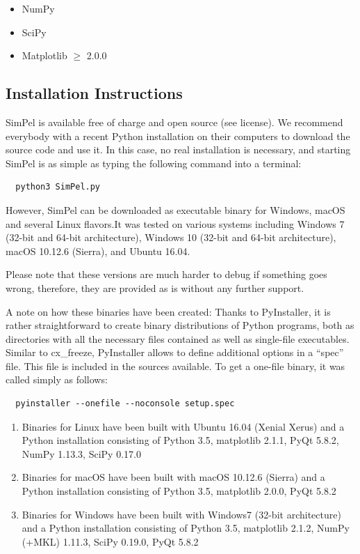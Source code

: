 \documentclass[pdftex,bezier,german,a4,twoside, headexclude,12pt,nochapterprefix, titlepage]{extarticle}
\newcommand{\simpel}{\textsf{SimPel}}
\begin{document}
\begin{itemize}
\item NumPy
\item SciPy
\item Matplotlib $\ge$ 2.0.0
\end{itemize}



\subsection{Installation Instructions}

\simpel{} is available free of charge and open source (see license). We recommend everybody with a recent Python installation on their computers to download the source code and use it. In this case, no real installation is necessary, and starting \simpel{} is as simple as typing the following command into a terminal:

\begin{verbatim}
  python3 SimPel.py
\end{verbatim}

However, \simpel{} can be downloaded as executable binary for Windows, macOS and several Linux flavors.It was tested on various systems including Windows 7 (32-bit and 64-bit architecture), Windows 10 (32-bit and 64-bit architecture), macOS 10.12.6 (Sierra), and Ubuntu 16.04.

Please note that these versions are much harder to debug if something goes wrong, therefore, they are provided as is without any further support. 


A note on how these binaries have been created: Thanks to PyInstaller, it is rather straightforward to create binary distributions of Python programs, both as directories with all the necessary files contained as well as single-file executables.  Similar to cx\_freeze, PyInstaller allows to define additional options in a ``spec'' file.  This file is included in the sources available. To get a one-file binary, it was called simply as follows:

\begin{verbatim}
  pyinstaller --onefile --noconsole setup.spec
\end{verbatim}

\begin{enumerate}
\item Binaries for Linux have been built with Ubuntu 16.04 (Xenial Xerus) and a Python installation consisting of Python 3.5, matplotlib 2.1.1, PyQt 5.8.2,  NumPy 1.13.3, SciPy 0.17.0

\item  Binaries for macOS have been built with macOS 10.12.6 (Sierra) and a Python installation consisting of Python 3.5, matplotlib 2.0.0, PyQt 5.8.2

 \item  Binaries for Windows have been built with Windows7 (32-bit architecture) and a Python installation consisting of Python 3.5, matplotlib 2.1.2, NumPy (+MKL) 1.11.3, SciPy 0.19.0, PyQt 5.8.2
\end{enumerate}
\end{document}
